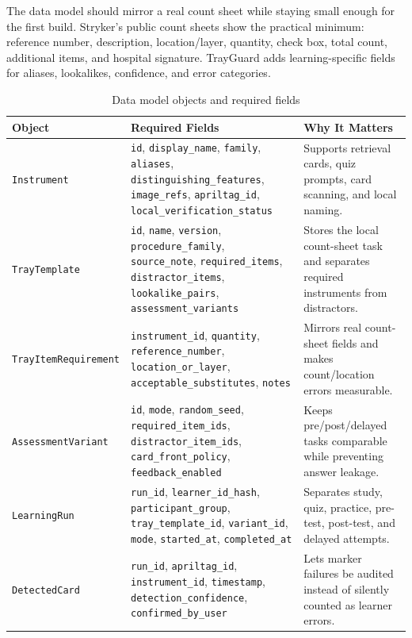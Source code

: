 \documentclass[10pt,a4paper]{article}
\begin{document}
The data model should mirror a real count sheet while staying small enough for
the first build. Stryker's public count sheets show the practical minimum:
reference number, description, location/layer, quantity, check box, total count,
additional items, and hospital signature. TrayGuard adds learning-specific
fields for aliases, lookalikes, confidence, and error categories.
\begin{table}[H]
\centering
\caption{Data model objects and required fields}
\label{tab:data-model-objects-and-required-fields}
\small\renewcommand{\arraystretch}{1.2}\setlength{\tabcolsep}{4pt}
\begin{tabularx}{\textwidth}{|>{\raggedright\arraybackslash}X|>{\raggedright\arraybackslash}X|>{\raggedright\arraybackslash}X|}
\hline
Object & Required Fields & Why It Matters \\
\hline
\texttt{Instrument} & \texttt{id}, \texttt{display\_name}, \texttt{family}, \texttt{aliases}, \texttt{distinguishing\_features}, \texttt{image\_refs}, \texttt{apriltag\_id}, \texttt{local\_verification\_status} & Supports retrieval cards, quiz prompts, card scanning, and local naming. \\
\hline
\texttt{TrayTemplate} & \texttt{id}, \texttt{name}, \texttt{version}, \texttt{procedure\_family}, \texttt{source\_note}, \texttt{required\_items}, \texttt{distractor\_items}, \texttt{lookalike\_pairs}, \texttt{assessment\_variants} & Stores the local count-sheet task and separates required instruments from distractors. \\
\hline
\texttt{TrayItemRequirement} & \texttt{instrument\_id}, \texttt{quantity}, \texttt{reference\_number}, \texttt{location\_or\_layer}, \texttt{acceptable\_substitutes}, \texttt{notes} & Mirrors real count-sheet fields and makes count/location errors measurable. \\
\hline
\texttt{AssessmentVariant} & \texttt{id}, \texttt{mode}, \texttt{random\_seed}, \texttt{required\_item\_ids}, \texttt{distractor\_item\_ids}, \texttt{card\_front\_policy}, \texttt{feedback\_enabled} & Keeps pre/post/delayed tasks comparable while preventing answer leakage. \\
\hline
\texttt{LearningRun} & \texttt{run\_id}, \texttt{learner\_id\_hash}, \texttt{participant\_group}, \texttt{tray\_template\_id}, \texttt{variant\_id}, \texttt{mode}, \texttt{started\_at}, \texttt{completed\_at} & Separates study, quiz, practice, pre-test, post-test, and delayed attempts. \\
\hline
\texttt{DetectedCard} & \texttt{run\_id}, \texttt{apriltag\_id}, \texttt{instrument\_id}, \texttt{timestamp}, \texttt{detection\_confidence}, \texttt{confirmed\_by\_user} & Lets marker failures be audited instead of silently counted as learner errors. \\

\end{tabularx}
\end{table}
\end{document}
